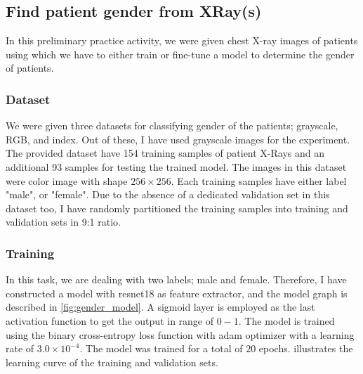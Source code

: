 \subsection{Find patient gender from XRay(s)}
\label{sec:warmup3}

    In this preliminary practice activity, we were given chest X-ray images of patients using which we have to either train or fine-tune a model to determine the gender of patients.

\subsubsection{Dataset}
\label{sec:orienattion-dataset}
    We were given three datasets for classifying gender of the patients; grayscale, RGB, and index. Out of these, I have used grayscale images for the experiment. The provided dataset have 154 training samples of patient X-Rays and an additional 93 samples for testing the trained model.  The images in this dataset were color image with shape $256 \times 256$. Each training samples have either label "male", or "female". Due to the absence of a dedicated validation set in this dataset too, I have randomly partitioned the training samples into training and validation sets in 9:1 ratio.

\subsubsection{Training}

    In this task, we are dealing with two labels; male and female. Therefore, I have constructed a model with resnet18 as feature extractor, and the model graph is described in \cref{fig:gender_model}. A sigmoid layer is employed as the last activation function to get the output in range of $0-1$. The model is trained using the binary cross-entropy loss function with adam optimizer with a learning rate of $3.0 \times 10^{-4}$. The model was trained for a total of $20$ epochs.  illustrates the learning curve of the training and validation sets.

